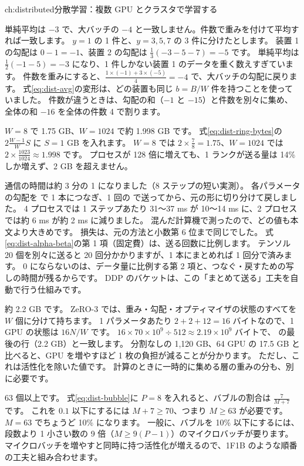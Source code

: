 \begin{answers}{ch:distributed}{分散学習：複数 GPU とクラスタで学習する}
\item 単純平均は $-3$ で、大バッチの $-4$ と一致しません。件数で重みを付けて平均すれば一致します。
$y=1$ の 1 件と、$y=3,5,7$ の 3 件に分けたとします。
装置 1 の勾配は $0-1=-1$、装置 2 の勾配は $\frac13(-3-5-7)=-5$ です。
単純平均は $\frac12(-1-5)=-3$ になり、1 件しかない装置 1 のデータを重く数えすぎています。
件数を重みにすると、$\frac{1\times(-1)+3\times(-5)}{4}=-4$ で、大バッチの勾配に戻ります。
式\eqref{eq:dist-avg}の変形は、どの装置も同じ $b=B/W$ 件を持つことを使っていました。
件数が違うときは、勾配の和（$-1$ と $-15$）と件数を別々に集め、全体の和 $-16$ を全体の件数 4 で割ります。
\item $W=8$ で 1.75 GB、$W=1024$ で約 1.998 GB です。
式\eqref{eq:dist-ring-bytes}の $2\frac{W-1}{W}S$ に $S=1$ GB を入れます。
$W=8$ では $2\times\frac78=1.75$、$W=1024$ では $2\times\frac{1023}{1024}\approx1.998$ です。
プロセスが 128 倍に増えても、1 ランクが送る量は 14\% しか増えず、2 GB を超えません。
\item 通信の時間は約 3 分の 1 になりました（8 ステップの短い実測）。
各パラメータの勾配を  で 1 本につなぎ、1 回の  で送ってから、元の形に切り分けて戻しました。
4 プロセスでは 1 ステップあたり 31〜37 ms が 10〜14 ms に、2 プロセスでは約 6 ms が約 2 ms に減りました。
混んだ計算機で測ったので、どの値も本文より大きめです。
損失は、元の方法と小数第 6 位まで同じでした。
式\eqref{eq:dist-alpha-beta}の第 1 項（固定費）は、送る回数に比例します。
テンソル 20 個を別々に送ると 20 回分かかりますが、1 本にまとめれば 1 回分で済みます。
0 にならないのは、データ量に比例する第 2 項と、つなぐ・戻すための写しの時間が残るからです。
DDP のバケットは、この「まとめて送る」工夫を自動で行う仕組みです。
\item 約 2.2 GB です。
ZeRO-3 では、重み・勾配・オプティマイザの状態のすべてを $W$ 個に分けて持ちます。
1 パラメータあたり $2+2+12=16$ バイトなので、1 GPU の状態は $16N/W$ です。
$16\times70\times10^{9}\div512\approx2.19\times10^{9}$ バイトで、 の最後の行（2.2 GB）と一致します。
分割なしの 1,120 GB、64 GPU の 17.5 GB と比べると、GPU を増やすほど 1 枚の負担が減ることが分かります。
ただし、これは活性化を除いた値です。
計算のときに一時的に集める層の重みの分も、別に必要です。
\item 63 個以上です。
式\eqref{eq:dist-bubble}に $P=8$ を入れると、バブルの割合は $\frac{7}{M+7}$ です。
これを $0.1$ 以下にするには $M+7\ge70$、つまり $M\ge63$ が必要です。
$M=63$ でちょうど 10\% になります。
一般に、バブルを 10\% 以下にするには、段数より 1 小さい数の 9 倍（$M\ge9(P-1)$）のマイクロバッチが要ります。
マイクロバッチを増やすと同時に持つ活性化が増えるので、1F1B のような順番の工夫と組み合わせます。
\end{answers}
